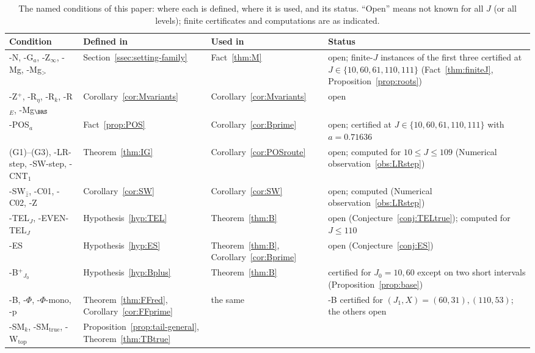 \begin{table}[!tp]
\centering\scriptsize
\caption{The named conditions of this paper: where each is defined, where it is used, and its status. ``Open'' means not
known for all $J$ (or all levels); finite certificates and computations are as indicated.}\label{tab:named}
\begin{tabular}{@{}>{\raggedright\arraybackslash}p{}>{\raggedright\arraybackslash}p{}>{\raggedright\arraybackslash}p{}>{\raggedright\arraybackslash}p{}@{}}
\toprule
Condition & Defined in & Used in & Status \\
\midrule
\hyp{N}, \hyp{G$_a$}, \hyp{Z$_\infty$}, \hyp{Mg}, \hyp{Mg$_>$} & Section~\ref{ssec:setting-family} & Fact~\ref{thm:M} & open; finite-$J$ instances of the
first three certified at $J\in\{10,60,61,110,111\}$ (Fact~\ref{thm:finiteJ}, Proposition~\ref{prop:roots}) \\
\hyp{Z$^+$}, \hyp{R$_\eta$}, \hyp{R$_k$}, \hyp{R$_E$}, \hyp{Mg$_{\BRS}$} & Corollary~\ref{cor:Mvariants} & Corollary~\ref{cor:Mvariants} & open \\
\hyp{POS$_a$} & Fact~\ref{prop:POS} & Corollary~\ref{cor:Bprime} & open; certified at $J\in\{10,60,61,110,111\}$ with $a=0.71636$ \\
(G1)--(G3), \hyp{LR-step}, \hyp{SW-step}, \hyp{CNT$_1$} & Theorem~\ref{thm:IG} & Corollary~\ref{cor:POSroute} & open; computed for
$10\le J\le109$ (Numerical observation~\ref{obs:LRstep}) \\
\hyp{SW$_{\hat z}$}, \hyp{C01}, \hyp{C02}, \hyp{Z} & Corollary~\ref{cor:SW} & Corollary~\ref{cor:SW} & open; computed
(Numerical observation~\ref{obs:LRstep}) \\
\hyp{TEL$_J$}, \hyp{EVEN-TEL$_J$} & Hypothesis~\ref{hyp:TEL} & Theorem~\ref{thm:B} & open (Conjecture~\ref{conj:TELtrue});
computed for $J\le110$ \\
\hyp{ES} & Hypothesis~\ref{hyp:ES} & Theorem~\ref{thm:B}, Corollary~\ref{cor:Bprime} & open (Conjecture~\ref{conj:ES}) \\
\hyp{B$^+$}$_{J_0}$ & Hypothesis~\ref{hyp:Bplus} & Theorem~\ref{thm:B} & certified for $J_0=10,60$ except on two short intervals
(Proposition~\ref{prop:base}) \\
\hyp{B}, \hyp{$\Phi$}, \hyp{$\Phi$-mono}, \hyp{p} & Theorem~\ref{thm:FFred}, Corollary~\ref{cor:FFprime} & the same & \hyp{B} certified
for $(J_1,X)=(60,31),(110,53)$; the others open \\
\hyp{SM}$_k$, \hyp{SM}$_{\mathrm{true}}$, \hyp{W}$_{\mathrm{top}}$ & Proposition~\ref{prop:tail-general}, Theorem~\ref{thm:TBtrue} &

\end{tabular}
\end{table}
